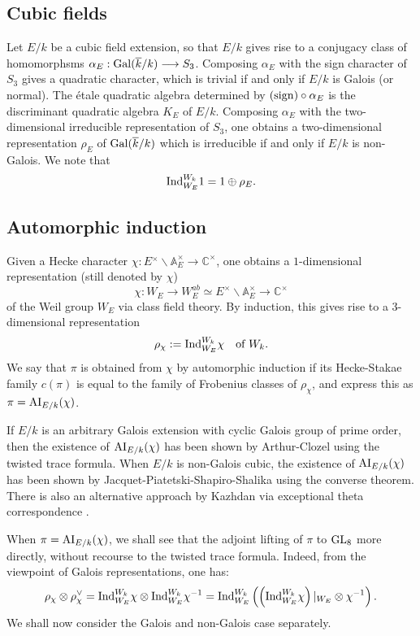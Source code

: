 \documentclass[11pt]{amsart}
\theoremstyle{plain}
\numberwithin{equation}{section}
\newcommand{\C}{\mathbb C}
\newcommand{\A}{\mathbb A}
\def\GL{{\rm GL}}
\def\A{{\mathbb A}}
\def\C{{\bf C}}
\def\C{{\mathbb C}}
\begin{document}
\subsection{\bf Cubic fields} Let $E/k$ be a cubic field extension, so that $E/k$ gives rise to a conjugacy class of homomorphsms $\alpha_E: {\rm Gal}(\overline{k}/k) \longrightarrow S_3$. 
Composing $\alpha_E$ with the sign character of $S_3$ gives a quadratic character, which is trivial if and only if $E/k$ is Galois (or normal). The \'etale quadratic 
algebra determined by $({\rm sign}) \circ \alpha_E$ is the discriminant quadratic algebra $K_E$ of $E/k$.  Composing $\alpha_E$ with the two-dimensional irreducible representation of $S_3$, one obtains a two-dimensional representation $\rho_E$  of ${\rm Gal}(\overline{k}/k)$ which is irreducible if and only if $E/k$ is non-Galois.  We note that
\[  {\rm Ind}_{W_E}^{W_k} 1 = 1 \oplus \rho_E. \]
\vskip 5pt


\subsection{\bf Automorphic induction} \label{SS:AI}
 Given a Hecke character $\chi: E{^\times} \backslash \A_E^{\times} \longrightarrow \C^{\times}$, one obtains a $1$-dimensional representation (still denoted by $\chi$) 
\[ \chi: W_E \longrightarrow W_E^{ab} \simeq E^{\times} \backslash \A_E^{\times}  \longrightarrow \C^{\times} \]
of the Weil group $W_E$ via  class field theory. By induction, this gives rise to a 3-dimensional representation
\[  \rho_{\chi} := {\rm Ind}_{W_E}^{W_k} \chi  \quad \text{of $W_k$.} \]
We say that $\pi$ is  obtained from $\chi$ by automorphic induction if its  Hecke-Stakae family $c(\pi)$ is equal to the family of Frobenius classes of $\rho_{\chi}$, and express this as $\pi = {\rm AI}_{E/k}(\chi)$. 

\vskip 5pt

If $E/k$ is an arbitrary  Galois extension with cyclic Galois group of prime order, then the existence of ${\rm AI}_{E/k}(\chi)$ has been shown by Arthur-Clozel \cite{AC} using the twisted trace formula. When $E/k$ is non-Galois cubic, the existence of ${\rm AI}_{E/k}(\chi)$ has been shown by Jacquet-Piatetski-Shapiro-Shalika \cite[\S 14]{JPSS} using the converse theorem.
There is also an alternative approach by Kazhdan via exceptional theta correspondence \cite{K}. 
\vskip 5pt

When $\pi ={\rm AI}_{E/k}(\chi)$, we shall see that the adjoint lifting of $\pi$ to $\GL_8$ more directly, without recourse to the twisted trace formula. 
Indeed, from the viewpoint of Galois representations, one has:
\[  \rho_{\chi} \otimes \rho_{\chi}^{\vee} = {\rm Ind}_{W_E}^{W_k} \chi \otimes  {\rm Ind}_{W_E}^{W_k} \chi^{-1} 
= {\rm Ind}_{W_E}^{W_k}\left(  \left(  {\rm Ind}_{W_E}^{W_k} \chi \right)|_{W_E} \otimes \chi^{-1} \right). \]
We shall now consider the Galois and non-Galois case separately.
\vskip 5pt
\end{document}
